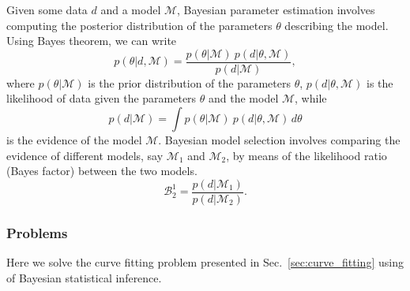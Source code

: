 Given some data $d$ and a model $\mathcal{M}$, Bayesian parameter estimation involves computing the posterior distribution of the parameters $\theta$ describing the model. Using Bayes theorem, we can write 
\begin{equation}
p(\theta | d, \mathcal{M}) = \frac{p(\theta | \mathcal{M}) ~ p(d | \theta , \mathcal{M})}{p(d | \mathcal{M})}, 
\end{equation}
where $p(\theta | \mathcal{M})$ is the prior distribution of the parameters $\theta$, $p(d | \theta , \mathcal{M})$ is the likelihood of data given the parameters $\theta$ and the model $\mathcal{M}$, while 
\begin{equation}
p(d | \mathcal{M}) = \int p(\theta | \mathcal{M}) ~ p(d | \theta , \mathcal{M}) \, d\theta
\label{eq:evidence}
\end{equation}
is the evidence of the model $\mathcal{M}$. Bayesian model selection involves comparing the evidence of different models, say $\mathcal{M}_1$ and $\mathcal{M}_2$, by means of the likelihood ratio (Bayes factor) between the two models. 
\begin{equation}
\mathcal{B}^1_2 =  \frac{p(d | \mathcal{M}_1)}{p(d | \mathcal{M}_2)}. 
\end{equation}

\subsubsection{Problems}
Here we solve the curve fitting problem presented in Sec.~\ref{sec:curve_fitting} using of Bayesian statistical inference. 

